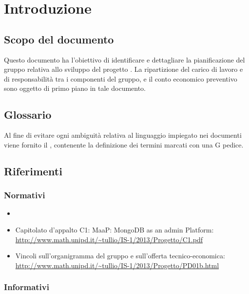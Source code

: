 \section{Introduzione}

	\subsection{Scopo del documento}

Questo documento ha l'obiettivo di identificare e dettagliare la pianificazione del gruppo \GroupName{} relativa allo sviluppo del progetto \ProjectName{}. La ripartizione del carico di lavoro e di responsabilità tra i componenti del gruppo, e il conto economico preventivo sono oggetto di primo piano in tale documento.

	\subsection{Glossario}

Al fine di evitare ogni ambiguità relativa al linguaggio impiegato nei documenti viene fornito il \Glossario{} , contenente la definizione dei termini marcati con una G pedice.	
	
	\subsection{Riferimenti}
	
		\subsubsection{Normativi}
		
		\begin{itemize}
		\item \NormeDiProgetto
		\item Capitolato d'appalto C1: MaaP: MongoDB as an admin Platform:\\
			\url{http://www.math.unipd.it/~tullio/IS-1/2013/Progetto/C1.pdf}
		\item Vincoli sull'organigramma del gruppo e sull'offerta tecnico-economica:\\
			\url{http://www.math.unipd.it/~tullio/IS-1/2013/Progetto/PD01b.html}
        \end{itemize}
        
		\subsubsection{Informativi}
		
